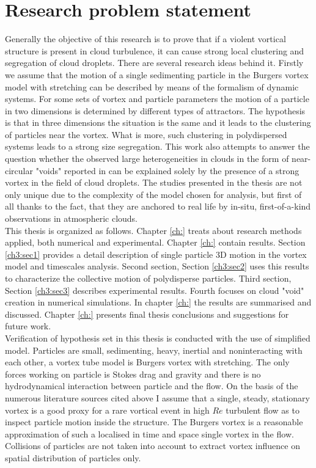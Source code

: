 \documentclass[../main.tex]{subfiles}
\begin{document}
\section{Research problem statement}
Generally the objective of this research is to prove that if a violent vortical structure is present in cloud turbulence, it can cause strong local clustering and segregation of cloud droplets. There are several research ideas behind it. Firstly we assume that the motion of a single sedimenting particle in the Burgers vortex model with stretching can be described by means of the formalism of dynamic systems. For some sets of vortex and particle parameters the motion of a particle in two dimensions is determined by different types of attractors. The hypothesis is that in three dimensions the situation is the same and it leads to the clustering of particles near the vortex. What is more, such clustering in polydispersed systems leads to a strong size segregation. This work also attempts to answer the question whether the observed large heterogeneities in clouds in the form of near-circular "voids" reported in \citet{Xu2012} can be explained solely by the presence of a strong vortex in the field of cloud droplets. The studies presented in the thesis are not only unique due to the complexity of the model chosen for analysis, but first of all thanks to the fact, that they are anchored to real life by in-situ, first-of-a-kind observations in atmospheric clouds.\\
This thesis is organized as follows. Chapter \ref{ch:} treats about research methods applied, both numerical and experimental. Chapter \ref{ch:} contain results. Section \ref{ch3:sec1} provides a detail description of single particle 3D motion in the vortex model and timescales analysis. Second section, Section \ref{ch3:sec2} uses this results to characterize the collective motion of polydisperse particles. Third section, Section \ref{ch3:sec3} describes experimental results. Fourth focuses on cloud "void" creation in numerical simulations. In chapter \ref{ch:} the results are summarised and discussed. Chapter \ref{ch:} presents final thesis conclusions and suggestions for future work.\\
Verification of hypothesis set in this thesis is conducted with the use of simplified model. Particles are small, sedimenting, heavy, inertial and noninteracting with each other, a vortex tube model is Burgers vortex with stretching. The only forces working on particle is Stokes drag and gravity and there is no hydrodynamical interaction between particle and the flow. On the basis of the numerous literature sources cited above I assume that a single, steady, stationary vortex is a good proxy for a rare vortical event in high $Re$ turbulent flow as to inspect particle motion inside the structure. The Burgers vortex is a reasonable approximation of such a localised in time and space single vortex in the flow. Collisions of particles are not taken into account to extract vortex influence on spatial distribution of particles only.\\
\end{document}
